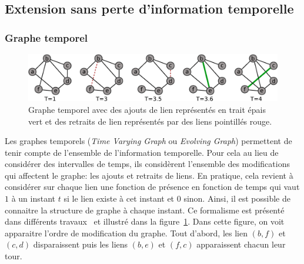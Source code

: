 
\subsection{Extension sans perte d'information temporelle}
\label{subsec:pasperte_info}
\subsubsection{Graphe temporel}
\begin{figure}[h]
\centering
\includegraphics[width=0.9\linewidth]{img/Intro/evolvingGraph.eps}
\caption{Graphe temporel avec des ajouts de lien représentés en trait épais vert et des retraits de lien représentés par des liens pointillés rouge.
}
\label{fig:exemple_evolving}
\end{figure}
Les graphes temporels (\emph{Time Varying Graph} ou \emph{Evolving Graph})
permettent de tenir compte de l'ensemble de l'information temporelle.
Pour cela au lieu de considérer des intervalles de temps, ils considèrent l'ensemble des modifications qui affectent le graphe: les ajouts et retraits de liens.
En pratique, cela revient à considérer sur chaque lien une fonction de présence en fonction de temps qui vaut $1$ à un instant $t$ si le lien existe à cet instant et $0$ sinon.
Ainsi, il est possible de connaitre la structure de graphe à chaque instant.
Ce formalisme est présenté dans différents travaux~\cite{Casteigts2011,Wehmuth2014} et illustré dans la figure~\ref{fig:exemple_evolving}.
Dans cette figure, on voit apparaitre l'ordre de modification du graphe.
Tout d'abord, les lien $(b,f)$ et $(c,d)$ disparaissent puis les liens $(b,e)$ et $(f,c)$ apparaissent chacun leur tour. 

